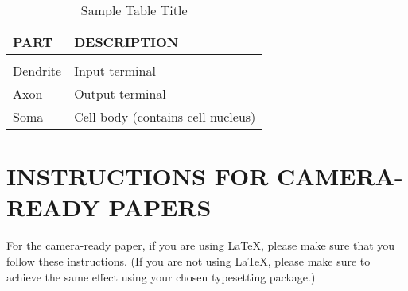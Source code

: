 \documentclass[twoside]{article}
\begin{document}
\begin{table}[h]
\caption{Sample Table Title} \label{sample-table}
\begin{center}
\begin{tabular}{ll}
{\bf PART}  &{\bf DESCRIPTION} \\
\hline \\
Dendrite         &Input terminal \\
Axon             &Output terminal \\
Soma             &Cell body (contains cell nucleus) \\
\end{tabular}
\end{center}
\end{table}

\newpage

\section{INSTRUCTIONS FOR CAMERA-READY PAPERS}

For the camera-ready paper, if you are using \LaTeX, please make sure
that you follow these instructions.  (If you are not using \LaTeX,
please make sure to achieve the same effect using your chosen
typesetting package.)
\end{document}
